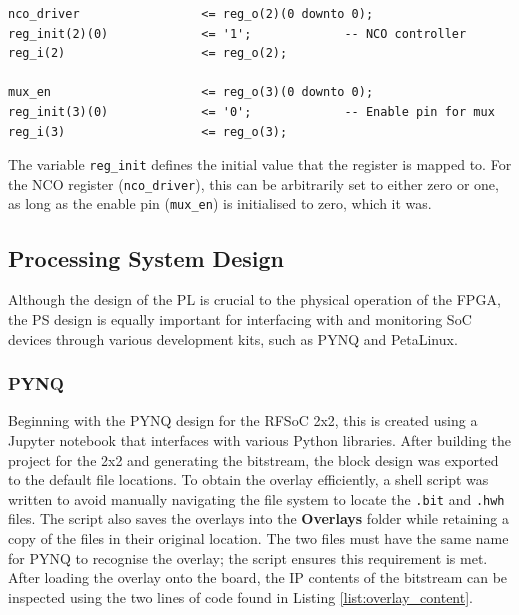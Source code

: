 \documentclass[12pt, a4paper]{article}
\begin{document}
\begin{listing}[h!]
\begin{verbatim}
nco_driver                 <= reg_o(2)(0 downto 0);
reg_init(2)(0)             <= '1';             -- NCO controller
reg_i(2)                   <= reg_o(2);

mux_en                     <= reg_o(3)(0 downto 0);
reg_init(3)(0)             <= '0';             -- Enable pin for mux
reg_i(3)                   <= reg_o(3);
\end{verbatim}
\caption{VHDL Register Definition}
\label{list: register_definition}
\end{listing}

The variable \texttt{reg\_init} defines the initial value that the register is mapped to. For the NCO register (\texttt{nco\_driver}), this can be arbitrarily set to either zero or one, as long as the enable pin (\texttt{mux\_en}) is initialised to zero, which it was. 

\newpage
\subsection{Processing System Design}

Although the design of the PL is crucial to the physical operation of the FPGA, the PS design is equally important for interfacing with and monitoring SoC devices through various development kits, such as PYNQ and PetaLinux.


\subsubsection{PYNQ}

Beginning with the PYNQ design for the RFSoC 2x2, this is created using a Jupyter notebook that interfaces with various Python libraries. After building the project for the 2x2 and generating the bitstream, the block design was exported to the default file locations. To obtain the overlay efficiently, a shell script was written to avoid manually navigating the file system to locate the \texttt{.bit} and \texttt{.hwh} files. The script also saves the overlays into the \textbf{Overlays} folder while retaining a copy of the files in their original location. The two files must have the same name for PYNQ to recognise the overlay; the script ensures this requirement is met. After loading the overlay onto the board, the IP contents of the bitstream can be inspected using the two lines of code found in Listing \ref{list:overlay_content}.
\end{document}
